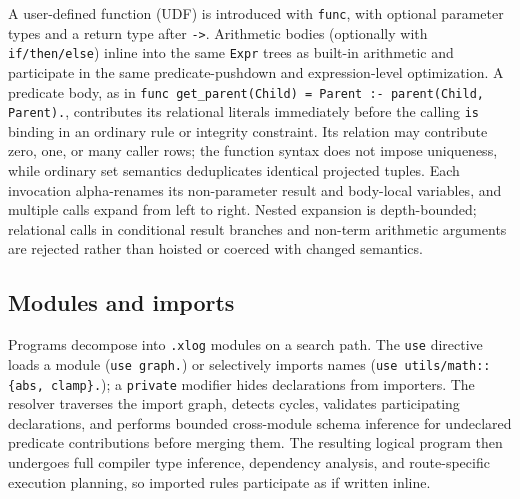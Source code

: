 A user-defined function (UDF) is introduced with \texttt{func}, with optional parameter types and a return type after \texttt{->}. Arithmetic bodies (optionally with \texttt{if/then/else}) inline into the same \texttt{Expr} trees as built-in arithmetic and participate in the same predicate-pushdown and expression-level optimization. A predicate body, as in \texttt{func get\_parent(Child) = Parent :- parent(Child, Parent).}, contributes its relational literals immediately before the calling \texttt{is} binding in an ordinary rule or integrity constraint. Its relation may contribute zero, one, or many caller rows; the function syntax does not impose uniqueness, while ordinary set semantics deduplicates identical projected tuples. Each invocation alpha-renames its non-parameter result and body-local variables, and multiple calls expand from left to right. Nested expansion is depth-bounded; relational calls in conditional result branches and non-term arithmetic arguments are rejected rather than hoisted or coerced with changed semantics.



\subsection{Modules and imports}\label{sec:lang:modules}

Programs decompose into \texttt{.xlog} modules on a search path. The \texttt{use} directive loads a module (\texttt{use graph.}) or selectively imports names (\texttt{use utils/math::\{abs, clamp\}.}); a \texttt{private} modifier hides declarations from importers. The resolver traverses the import graph, detects cycles, validates participating declarations, and performs bounded cross-module schema inference for undeclared predicate contributions before merging them. The resulting logical program then undergoes full compiler type inference, dependency analysis, and route-specific execution planning, so imported rules participate as if written inline.





